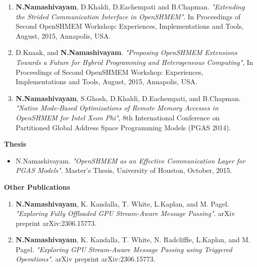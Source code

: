 \begin{enumerate}
{      Case Study with Coarray Fortran"}. In Proceedings of IEEE Cluster 2015,
      September, 2015, Chicago, USA.
\item \textbf{N.Namashivayam}, D.Khaldi, D.Eachempati and B.Chapman.
      \textit{"Extending the Strided Communication Interface in OpenSHMEM"}. In
      Proceedings of Second OpenSHMEM Workshop: Experiences, Implementations and
      Tools, August, 2015, Annapolis, USA.
\item D.Knaak, and \textbf{N.Namashivayam}.
      \textit{"Proposing OpenSHMEM Extensions Towards a Future for Hybrid
      Programming and Heterogeneous Computing"}, In Proceedings of Second
      OpenSHMEM Workshop: Experiences, Implementations and Tools, August, 2015,
      Annapolis, USA.
\item \textbf{N.Namashivayam}, S.Ghosh, D.Khaldi, D.Eachempati, and B.Chapman.
      \textit{"Native Mode-Based Optimizations of Remote Memory Accesses in
      OpenSHMEM for Intel Xeon Phi"}, 8th International Conference on Partitioned
      Global Address Space Programming Models (PGAS 2014).
\end{enumerate}

\textbf{Thesis}
\begin{itemize}
\item N.Namashivayam.
      \textit{"OpenSHMEM as an Effective Communication Layer for PGAS Models"}.
      Master's Thesis, University of Houston, October, 2015.
\end{itemize}

\textbf{Other Publications}
\begin{enumerate}
\setcounter{enumi}{0}
\item \textbf{N.Namashivayam}, K. Kandalla, T. White, L.Kaplan, and M. Pagel.
      \textit{"Exploring Fully Offloaded GPU Stream-Aware Message Passing"}.
      arXiv preprint arXiv:2306.15773.
\item \textbf{N.Namashivayam}, K. Kandalla, T. White, N. Radcliffle, L.Kaplan,
      and M. Pagel.
      \textit{"Exploring GPU Stream-Aware Message Passing using Triggered
      Operations"}. arXiv preprint arXiv:2306.15773.
\end{enumerate}


